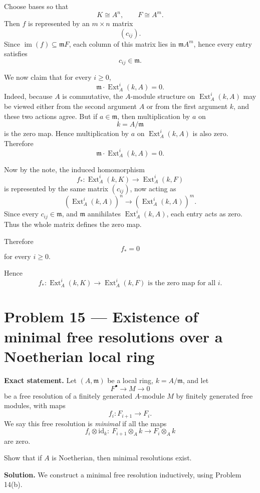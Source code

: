\documentclass[12pt,a4paper]{article}
\theoremstyle{notespace}
\begin{document}
Choose bases so that
\[
K\cong A^n,\qquad F\cong A^m.
\]
Then \(f\) is represented by an \(m\times n\) matrix
\[
(c_{ij}).
\]
Since \(\operatorname{im}(f)\subseteq \mathfrak m F\), each column of this matrix lies in \(\mathfrak m A^m\), hence every entry satisfies
\[
c_{ij}\in \mathfrak m.
\]

We now claim that for every \(i\ge 0\),
\[
\mathfrak m\cdot \operatorname{Ext}_A^i(k,A)=0.
\]
Indeed, because \(A\) is commutative, the \(A\)-module structure on \(\operatorname{Ext}_A^i(k,A)\) may be viewed either from the second argument \(A\) or from the first argument \(k\), and these two actions agree. But if \(a\in \mathfrak m\), then multiplication by \(a\) on
\[
k=A/\mathfrak m
\]
is the zero map. Hence multiplication by \(a\) on \(\operatorname{Ext}_A^i(k,A)\) is also zero. Therefore
\[
\mathfrak m\cdot \operatorname{Ext}_A^i(k,A)=0.
\]

Now by the note, the induced homomorphism
\[
f_*:\operatorname{Ext}_A^i(k,K)\to \operatorname{Ext}_A^i(k,F)
\]
is represented by the same matrix \((c_{ij})\), now acting as
\[
(\operatorname{Ext}_A^i(k,A))^n\to (\operatorname{Ext}_A^i(k,A))^m.
\]
Since every \(c_{ij}\in \mathfrak m\), and \(\mathfrak m\) annihilates \(\operatorname{Ext}_A^i(k,A)\), each entry acts as zero. Thus the whole matrix defines the zero map.

Therefore
\[
f_*=0
\]
for every \(i\ge 0\).

\medskip

Hence
\[
\boxed{
	f_*:\operatorname{Ext}_A^i(k,K)\longrightarrow \operatorname{Ext}_A^i(k,F)
	\text{ is the zero map for all }i.
}
\]	

\section{Problem 15 --- Existence of minimal free resolutions over a Noetherian local ring}

\textbf{Exact statement.}
Let \((A,\mathfrak m)\) be a local ring, \(k=A/\mathfrak m\), and let
\[
F^\bullet \to M \to 0
\]
be a free resolution of a finitely generated \(A\)-module \(M\) by finitely generated free modules, with maps
\[
f_i:F_{i+1}\to F_i.
\]
We say this free resolution is \emph{minimal} if all the maps
\[
f_i\otimes \mathrm{id}_k:\ F_{i+1}\otimes_A k \to F_i\otimes_A k
\]
are zero.

Show that if \(A\) is Noetherian, then minimal resolutions exist.

\textbf{Solution.}
We construct a minimal free resolution inductively, using Problem 14(b).
\end{document}
